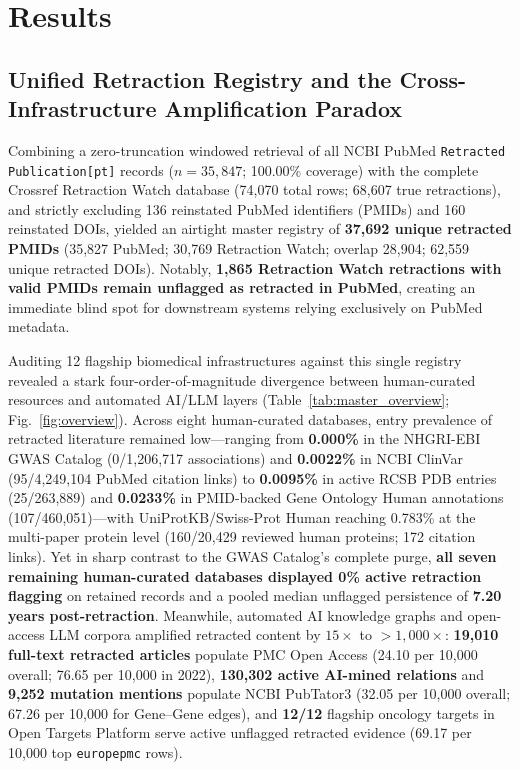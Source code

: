 \documentclass[11pt,letterpaper]{article}
\begin{document}
\section{Results}

\subsection{Unified Retraction Registry and the Cross-Infrastructure Amplification Paradox}
Combining a zero-truncation windowed retrieval of all NCBI PubMed \texttt{Retracted Publication[pt]} records ($n=35{,}847$; 100.00\% coverage) with the complete Crossref Retraction Watch database (74,070 total rows; 68,607 true retractions), and strictly excluding 136 reinstated PubMed identifiers (PMIDs) and 160 reinstated DOIs, yielded an airtight master registry of \textbf{37,692 unique retracted PMIDs} (35,827 PubMed; 30,769 Retraction Watch; overlap 28,904; 62,559 unique retracted DOIs). Notably, \textbf{1,865 Retraction Watch retractions with valid PMIDs remain unflagged as retracted in PubMed}, creating an immediate blind spot for downstream systems relying exclusively on PubMed metadata.

Auditing 12 flagship biomedical infrastructures against this single registry revealed a stark four-order-of-magnitude divergence between human-curated resources and automated AI/LLM layers (Table~\ref{tab:master_overview}; Fig.~\ref{fig:overview}). Across eight human-curated databases, entry prevalence of retracted literature remained low—ranging from \textbf{0.000\%} in the NHGRI-EBI GWAS Catalog (0/1,206,717 associations) and \textbf{0.0022\%} in NCBI ClinVar (95/4,249,104 PubMed citation links) to \textbf{0.0095\%} in active RCSB PDB entries (25/263,889) and \textbf{0.0233\%} in PMID-backed Gene Ontology Human annotations (107/460,051)—with UniProtKB/Swiss-Prot Human reaching 0.783\% at the multi-paper protein level (160/20,429 reviewed human proteins; 172 citation links). Yet in sharp contrast to the GWAS Catalog's complete purge, \textbf{all seven remaining human-curated databases displayed 0\% active retraction flagging} on retained records and a pooled median unflagged persistence of \textbf{7.20 years post-retraction}. Meanwhile, automated AI knowledge graphs and open-access LLM corpora amplified retracted content by $15\times$ to $>1{,}000\times$: \textbf{19,010 full-text retracted articles} populate PMC Open Access (24.10 per 10,000 overall; 76.65 per 10,000 in 2022), \textbf{130,302 active AI-mined relations} and \textbf{9,252 mutation mentions} populate NCBI PubTator3 (32.05 per 10,000 overall; 67.26 per 10,000 for Gene--Gene edges), and \textbf{12/12} flagship oncology targets in Open Targets Platform serve active unflagged retracted evidence (69.17 per 10,000 top \texttt{europepmc} rows).
\end{document}
